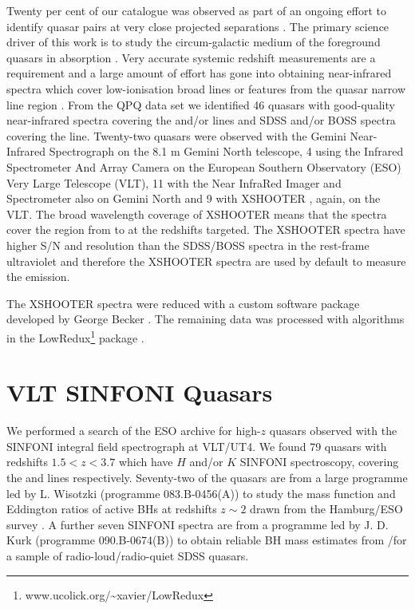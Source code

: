 Twenty per cent of our catalogue was observed as part of an ongoing effort to identify quasar pairs at very close projected separations \citep[Quasars Probing Quasars\footnote{www.ucolick.org/\textasciitilde xavier/QPQ/Quasars\_Probing\_Quasars} (QPQ);][]{hennawi06a,hennawi10}. 
The primary science driver of this work is to study the circum-galactic medium of the foreground quasars in absorption \citep{hennawi06b}.
Very accurate systemic redshift measurements are a requirement and a large amount of effort has gone into obtaining near-infrared spectra which cover low-ionisation broad lines or features from the quasar narrow line region \citep{prochaska09,lau15,hennawi15}. 
From the QPQ data set we identified 46 quasars with good-quality near-infrared spectra covering the \ha and/or \hb lines and SDSS and/or BOSS spectra covering the  line. 
Twenty-two quasars were observed with the Gemini Near-Infrared Spectrograph \citep[GNIRS;][]{elias06} on the 8.1 m Gemini North telescope, 4 using the Infrared Spectrometer And Array Camera \citep[ISAAC;][]{moorwood98b} on the European Southern Observatory (ESO) Very Large Telescope (VLT), 11 with the Near InfraRed Imager and Spectrometer \citep[NIRI;][]{hodapp03} also on Gemini North and 9 with XSHOOTER \citep{vernet11}, again, on the VLT. 
The broad wavelength coverage of XSHOOTER means that the spectra cover the region from  to \ha at the redshifts targeted. 
The XSHOOTER spectra have higher S/N and resolution than the SDSS/BOSS spectra in the rest-frame ultraviolet and therefore the XSHOOTER spectra are used by default to measure the  emission. 

The  XSHOOTER  spectra  were  reduced  with  a  custom  software  package  developed  by  George  Becker \citep[for details, see][]{lau15}. 
The remaining data was processed with algorithms in the LowRedux\footnote{www.ucolick.org/\textasciitilde xavier/LowRedux} package \citep[see][]{prochaska09}.

\section{VLT SINFONI Quasars}

We performed a search of the ESO archive for high-$z$ quasars observed with the SINFONI  integral  field  spectrograph \citep{eisenhauer03,bonnet04} at VLT/UT4.
We found 79 quasars with redshifts $1.5 < z < 3.7$ which have $H$ and/or $K$ SINFONI spectroscopy, covering the \hb and \ha lines respectively. 
Seventy-two of the quasars are from a large programme led by L. Wisotzki (programme 083.B-0456(A)) to study the mass function and Eddington ratios of active BHs at redshifts $z\sim 2$ drawn from the Hamburg/ESO survey \citep{wisotzki00}.
A further seven SINFONI spectra are from a programme led by  J. D. Kurk (programme 090.B-0674(B)) to obtain reliable BH mass estimates from \hans/\hb for a sample of radio-loud/radio-quiet SDSS quasars.

